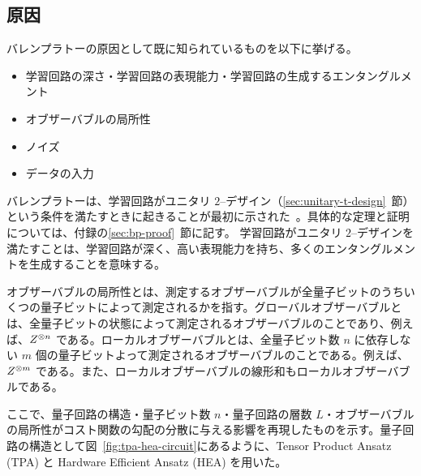 

\subsection{原因}\label{subsec:bp-cause}
バレンプラトーの原因として既に知られているものを以下に挙げる。
\begin{itemize}
    \item 学習回路の深さ・学習回路の表現能力・学習回路の生成するエンタングルメント~\cite{mcclean2018barren,cerezo2021cost,holmes2022connecting,marrero2021entanglement,leone2022practical}
    \item オブザーバブルの局所性~\cite{cerezo2021cost,uvarov2021barren}
    \item ノイズ~\cite{wang2021noiseinduced}
    \item データの入力~\cite{thanasilp2022exponential,thanasilp2021subtleties,leone2022practical}
\end{itemize}

バレンプラトーは、学習回路がユニタリ $2$--デザイン（\ref{sec:unitary-t-design}~節）という条件を満たすときに起きることが最初に示された~\cite{mcclean2018barren}。具体的な定理と証明については、付録の\ref{sec:bp-proof}~節に記す。
学習回路がユニタリ $2$--デザインを満たすことは、学習回路が深く、高い表現能力を持ち、多くのエンタングルメントを生成することを意味する。

オブザーバブルの局所性とは、測定するオブザーバブルが全量子ビットのうちいくつの量子ビットによって測定されるかを指す。グローバルオブザーバブルとは、全量子ビットの状態によって測定されるオブザーバブルのことであり、例えば、$Z^{\otimes {n}}$ である。ローカルオブザーバブルとは、全量子ビット数 $n$ に依存しない $m$ 個の量子ビットよって測定されるオブザーバブルのことである。例えば、$Z^{\otimes {m}}$ である。また、ローカルオブザーバブルの線形和もローカルオブザーバブルである。

ここで、量子回路の構造・量子ビット数 $n$・量子回路の層数 $L$・オブザーバブルの局所性がコスト関数の勾配の分散に与える影響を再現したものを示す。量子回路の構造として図~\ref{fig:tpa-hea-circuit}にあるように、Tensor Product Ansatz (TPA) と Hardware Efficient Ansatz (HEA) を用いた。

